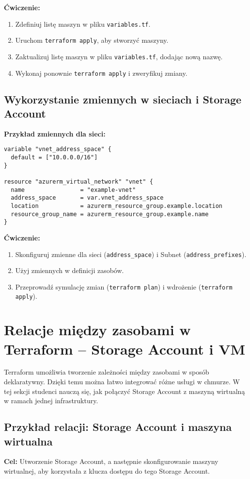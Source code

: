 \documentclass{article}
\begin{document}
\textbf{Ćwiczenie:}
\begin{enumerate}
    \item Zdefiniuj listę maszyn w pliku \texttt{variables.tf}.
    \item Uruchom \texttt{terraform apply}, aby stworzyć maszyny.
    \item Zaktualizuj listę maszyn w pliku \texttt{variables.tf}, dodając nową nazwę.
    \item Wykonaj ponownie \texttt{terraform apply} i zweryfikuj zmiany.
\end{enumerate}

\subsection{Wykorzystanie zmiennych w sieciach i Storage Account}
\textbf{Przykład zmiennych dla sieci:}
\begin{lstlisting}
variable "vnet_address_space" {
  default = ["10.0.0.0/16"]
}

resource "azurerm_virtual_network" "vnet" {
  name                = "example-vnet"
  address_space       = var.vnet_address_space
  location            = azurerm_resource_group.example.location
  resource_group_name = azurerm_resource_group.example.name
}
\end{lstlisting}

\textbf{Ćwiczenie:}
\begin{enumerate}
    \item Skonfiguruj zmienne dla sieci (\texttt{address\_space}) i Subnet (\texttt{address\_prefixes}).
    \item Użyj zmiennych w definicji zasobów.
    \item Przeprowadź symulację zmian (\texttt{terraform plan}) i wdrożenie (\texttt{terraform apply}).
\end{enumerate}


\section{Relacje między zasobami w Terraform – Storage Account i VM}
Terraform umożliwia tworzenie zależności między zasobami w sposób deklaratywny. Dzięki temu można łatwo integrować różne usługi w chmurze. W tej sekcji studenci nauczą się, jak połączyć Storage Account z maszyną wirtualną w ramach jednej infrastruktury.

\subsection{Przykład relacji: Storage Account i maszyna wirtualna}
\textbf{Cel:} Utworzenie Storage Account, a następnie skonfigurowanie maszyny wirtualnej, aby korzystała z klucza dostępu do tego Storage Account.
\end{document}
